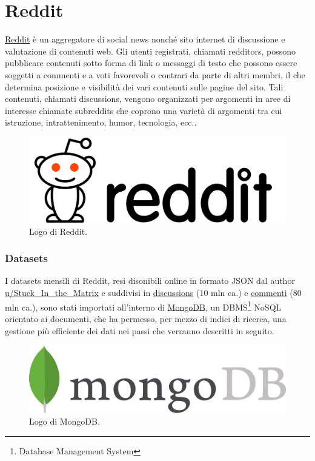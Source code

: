 \chapter{Reddit}

\href{https://www.reddit.com/}{Reddit} {\`e} un aggregatore di social news nonch{\'e} sito internet di discussione e valutazione di contenuti web. Gli utenti registrati, chiamati redditors, possono pubblicare contenuti sotto forma di link o messaggi di testo che possono essere soggetti a commenti e a voti favorevoli o contrari da parte di altri membri, il che determina posizione e visibilit{\`a} dei vari contenuti sulle pagine del sito. Tali contenuti, chiamati discussions, vengono organizzati per argomenti in aree di interesse chiamate subreddits che coprono una variet{\`a} di argomenti tra cui istruzione, intrattenimento, humor, tecnologia, ecc..

\begin{figure}\centering
\includegraphics[scale=0.15]{img/reddit}
\caption{Logo di Reddit.}
\end{figure}

\subsection{Datasets}

I datasets mensili di Reddit, resi disonibili online in formato JSON dal author \href{https://www.reddit.com/users/Stuck_In_the_Matrix/}{u/Stuck\_In\_the\_Matrix} e suddivisi in \href{https://files.pushshift.io/reddit/discussions/}{discussions} (10 mln ca.) e \href{https://files.pushshift.io/reddit/comments/}{commenti} (80 mln ca.), sono stati importati all'interno di \href{https://www.mongodb.com/it}{MongoDB}, un DBMS\footnote{Database Management System} NoSQL orientato ai documenti, che ha permesso, per mezzo di indici di ricerca, una gestione pi{\`u} efficiente dei dati nei passi che verranno descritti in seguito.

\begin{figure}\centering
\includegraphics[scale=0.175]{img/mongo}
\caption{Logo di MongoDB.}
\end{figure}

